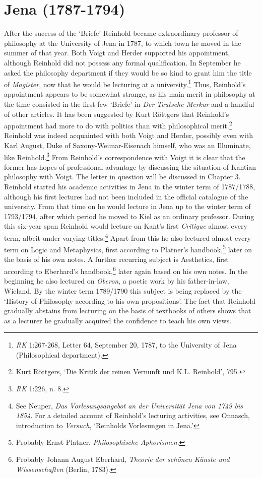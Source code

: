 \section{Jena (1787{-}1794)}


After the success of the `Briefe' Reinhold became extraordinary professor of philosophy at the University of Jena in 1787, to which town he moved in the summer of that year. Both Voigt and Herder supported his appointment, although Reinhold did not possess any formal qualification. In September he asked the philosophy department if they would be so kind to grant him the title of \textit{Magister}, now that he would be lecturing at a university.\footnote{ \textit{RK} 1:267{-}268, Letter 64, September 20, 1787, to the University of Jena (Philosophical department). } Thus, Reinhold's appointment appears to be somewhat strange, as his main merit in philosophy at the time consisted in the first few `Briefe' in \textit{Der Teutsche Merkur} and a handful of other articles. It has been suggested by Kurt R\"{o}ttgers that Reinhold's appointment had more to do with politics than with philosophical merit.\footnote{ Kurt R\"{o}ttgers, `Die Kritik der reinen Vernunft und K.L. Reinhold', 795.} Reinhold was indeed acquainted with both Voigt and Herder, possibly even with Karl August, Duke of Saxony{-}Weimar{-}Eisenach himself, who was an Illuminate, like Reinhold.\footnote{ \textit{RK} 1:226, n. 8.} From Reinhold's correspondence with Voigt it is clear that the former has hopes of professional advantage by discussing the situation of Kantian philosophy with Voigt. The letter in question will be discussed in Chapter 3. Reinhold started his academic activities in Jena in the winter term of 1787/1788, although his first lectures had not been included in the official catalogue of the university. From that time on he would lecture in Jena up to the winter term of 1793/1794, after which period he moved to Kiel as an ordinary professor. During this six{-}year span Reinhold would lecture on Kant's first \textit{Critique} almost every term, albeit under varying titles.\footnote{ See Neuper, \textit{Das Vorlesungsangebot an der Universit\"{a}t Jena von 1749 bis 1854}. For a detailed account of Reinhold's lecturing activities, see Onnasch, introduction to \textit{Versuch}, `Reinholds Vorlesungen in Jena.'} Apart from this he also lectured almost every term on Logic and Metaphysics, first according to Platner's handbook,\footnote{ Probably Ernst Platner, \textit{Philosophische Aphorismen}.} later on the basis of his own notes. A further recurring subject is Aesthetics, first according to Eberhard's handbook,\footnote{ Probably Johann August Eberhard, \textit{Theorie der sch\"{o}nen K\"{u}nste und Wissenschaften} (Berlin, 1783). } later again based on his own notes. In the beginning he also lectured on \textit{Oberon}, a poetic work by his father{-}in{-}law, Wieland. By the winter term 1789/1790 this subject is being replaced by the `History of Philosophy according to his own propositions'. The fact that Reinhold gradually abstains from lecturing on the basis of textbooks of others shows that as a lecturer he gradually acquired the confidence to teach his own views. 

